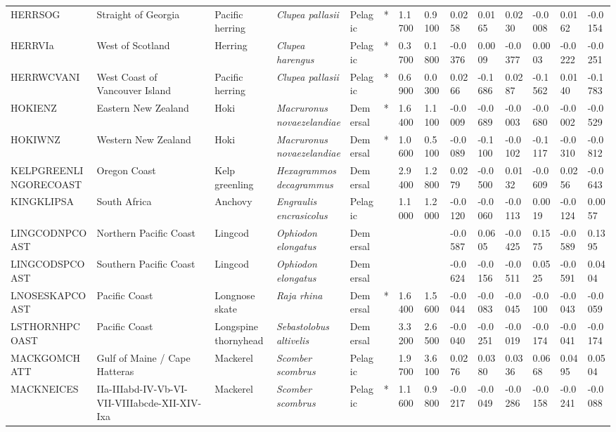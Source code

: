 \begin{longtable}{p{2.6cm}p{1.9cm}p{1.7cm}p{1.6cm}p{1cm}p{0.3cm}p{1cm}p{1cm}p{1cm}p{1.1cm}p{1cm}p{1.1cm}p{1cm}p{1.1cm}}
  HERRSOG & Straight of Georgia & Pacific herring & \textit{Clupea pallasii} & Pelagic & * & 1.1700 & 0.9100 & 0.0258 & 0.0165 & 0.0230 & -0.0008 & 0.0162 & -0.0154 \\ 
  HERRVIa & West of Scotland & Herring & \textit{Clupea harengus} & Pelagic & * & 0.3700 & 0.1800 & -0.0376 & 0.0009 & -0.0377 & 0.0003 & -0.0222 & -0.0251 \\ 
  HERRWCVANI & West Coast of Vancouver Island & Pacific herring & \textit{Clupea pallasii} & Pelagic & * & 0.6900 & 0.0300 & 0.0266 & -0.1686 & 0.0287 & -0.1562 & 0.0140 & -0.1783 \\ 
  HOKIENZ & Eastern New Zealand & Hoki & \textit{Macruronus novaezelandiae} & Demersal & * & 1.6400 & 1.1100 & -0.0009 & -0.0689 & -0.0003 & -0.0680 & -0.0002 & -0.0529 \\ 
  HOKIWNZ & Western New Zealand & Hoki & \textit{Macruronus novaezelandiae} & Demersal & * & 1.0600 & 0.5100 & -0.0089 & -0.1100 & -0.0102 & -0.1117 & -0.0310 & -0.0812 \\ 
  KELPGREENLINGORECOAST & Oregon Coast & Kelp greenling & \textit{Hexagrammos decagrammus} & Demersal &   & 2.9400 & 1.2800 & 0.0279 & -0.0500 & 0.0132 & -0.0609 & 0.0256 & -0.0643 \\ 
  KINGKLIPSA & South Africa & Anchovy & \textit{Engraulis encrasicolus} & Pelagic &   & 1.1000 & 1.2000 & -0.0120 & -0.0060 & -0.0113 & 0.0019 & -0.0124 & 0.0057 \\ 
  LINGCODNPCOAST & Northern Pacific Coast & Lingcod & \textit{Ophiodon elongatus} & Demersal &  &  &  & -0.0587 & 0.0605 & -0.0425 & 0.1575 & -0.0589 & 0.1395 \\ 
  LINGCODSPCOAST & Southern Pacific Coast & Lingcod & \textit{Ophiodon elongatus} & Demersal &  &  &  & -0.0624 & -0.0156 & -0.0511 & 0.0525 & -0.0591 & 0.0404 \\ 
  LNOSESKAPCOAST & Pacific Coast & Longnose skate & \textit{Raja rhina} & Demersal & * & 1.6400 & 1.5600 & -0.0044 & -0.0083 & -0.0045 & -0.0100 & -0.0043 & -0.0059 \\ 
  LSTHORNHPCOAST & Pacific Coast & Longspine thornyhead & \textit{Sebastolobus altivelis} & Demersal &   & 3.3200 & 2.6500 & -0.0040 & -0.0251 & -0.0019 & -0.0174 & -0.0041 & -0.0174 \\ 
  MACKGOMCHATT & Gulf of Maine / Cape Hatteras & Mackerel & \textit{Scomber scombrus} & Pelagic &   & 1.9700 & 3.6100 & 0.0276 & 0.0380 & 0.0336 & 0.0668 & 0.0495 & 0.0504 \\ 
  MACKNEICES & IIa-IIIabd-IV-Vb-VI-VII-VIIIabcde-XII-XIV-Ixa & Mackerel & \textit{Scomber scombrus} & Pelagic & * & 1.1600 & 0.9800 & -0.0217 & -0.0049 & -0.0286 & -0.0158 & -0.0241 & -0.0088 \\ 

\end{longtable}
